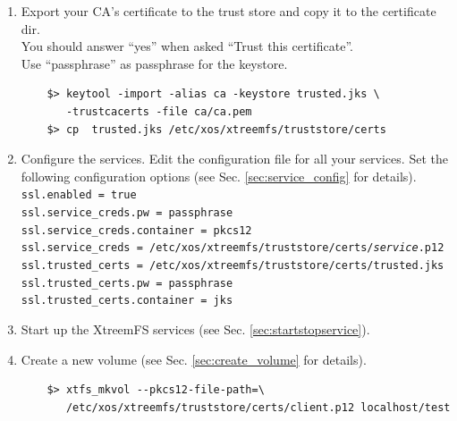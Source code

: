 \documentclass[a4paper,10pt]{book}
\begin{document}
\begin{enumerate}
\begin{enumerate}
	\item Export the service credentials (certificate and private key) as a PKCS\#12 file.\\
		Use ``passphrase'' as export password. You can leave the export password empty for the XtreemFS Client to avoid being asked for the password on mount.
		\begin{Verbatim}[commandchars=\\\{\}]
$> openssl pkcs12 -export -in \textit{service}.pem -inkey \textit{service}.key \ \\
   -out \textit{service}.p12 -name "\textit{service}"
		\end{Verbatim}

	\item Copy the PKCS\#12 file to the certificates directory.
		\begin{Verbatim}[commandchars=\\\{\}]
$> mkdir -p /etc/xos/xtreemfs/truststore/certs \\
$> cp \textit{service}.p12 /etc/xos/xtreemfs/truststore/certs
		\end{Verbatim}

	\end{enumerate}
 \item Export your CA's certificate to the trust store and copy it to the certificate dir.\\
	You should answer ``yes'' when asked ``Trust this certificate''.\\
	Use ``passphrase'' as passphrase for the keystore.
	\begin{verbatim}
	$> keytool -import -alias ca -keystore trusted.jks \
	   -trustcacerts -file ca/ca.pem
	$> cp  trusted.jks /etc/xos/xtreemfs/truststore/certs
	\end{verbatim}

 \item Configure the services.
	Edit the configuration file for all your services. Set the following configuration options (see Sec. \ref{sec:service_config} for details).\\
	\texttt{ssl.enabled = true}\\
	\texttt{ssl.service\_creds.pw = passphrase}\\
	\texttt{ssl.service\_creds.container = pkcs12}\\
	\texttt{ssl.service\_creds = /etc/xos/xtreemfs/truststore/certs/\textit{service}.p12}\\
	\texttt{ssl.trusted\_certs = /etc/xos/xtreemfs/truststore/certs/trusted.jks}\\
	\texttt{ssl.trusted\_certs.pw = passphrase}\\
	\texttt{ssl.trusted\_certs.container = jks}
 \item Start up the XtreemFS services (see Sec. \ref{sec:startstopservice}).
 \item Create a new volume (see Sec. \ref{sec:create_volume} for details).
	\begin{verbatim}
	$> xtfs_mkvol --pkcs12-file-path=\
	   /etc/xos/xtreemfs/truststore/certs/client.p12 localhost/test
	\end{verbatim}


\end{enumerate}
\end{document}

